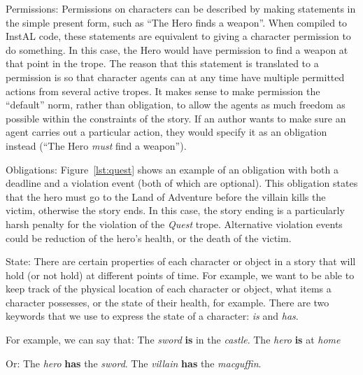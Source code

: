 \documentclass[11pt]{report}
\begin{document}
\begin{compactdesc}
\item[Permissions:]
Permissions on characters can be described by making statements in the simple present form, such as ``The Hero finds a weapon''. When compiled to InstAL code, these statements are equivalent to giving a character permission to do something. In this case, the Hero would have permission to find a weapon at that point in the trope.
The reason that this statement is translated to a permission is so that character agents can at any time have multiple permitted actions from several active tropes. It makes sense to make permission the ``default'' norm, rather than obligation, to allow the agents as much freedom as possible within the constraints of the story. If an author wants to make sure an agent carries out a particular action, they would specify it as an obligation instead (``The Hero \emph{must} find a weapon'').

\item[Obligations:]
Figure~\ref{lst:quest} shows an example of an obligation with both a deadline and a violation event (both of which are optional). This obligation states that the hero must go to the Land of Adventure before the villain kills the victim, otherwise the story ends. In this case, the story ending is a particularly harsh penalty for the violation of the \emph{Quest} trope. Alternative violation events could be reduction of the hero's health, or the death of the victim.

\item[State:]
There are certain properties of each character or object in a story that will hold (or not
hold) at different points of time. For example, we want to be able to keep track
of the physical location of each character or object, what items a character possesses, or the
state of their health, for example. There are two keywords that we use to
express the state of a character: \emph{is} and \emph{has}.

For example, we can say that:
The \emph{sword} \textbf{is} in the \emph{castle}.
The \emph{hero} \textbf{is} at \emph{home}

Or:
The \emph{hero} \textbf{has} the \emph{sword}.
The \emph{villain} \textbf{has} the \emph{macguffin}.


\end{compactdesc}
\end{document}
